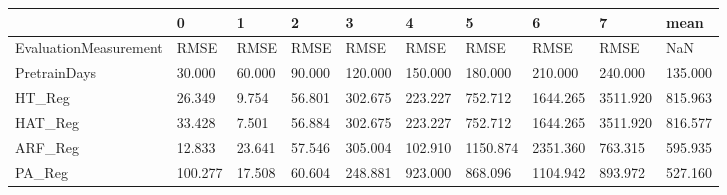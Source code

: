 \begin{tabular}{llllllllll}
\toprule
{} &       0 &      1 &      2 &       3 &       4 &        5 &        6 &        7 &    mean \\
\midrule
EvaluationMeasurement &    RMSE &   RMSE &   RMSE &    RMSE &    RMSE &     RMSE &     RMSE &     RMSE &     NaN \\
PretrainDays          &  30.000 & 60.000 & 90.000 & 120.000 & 150.000 &  180.000 &  210.000 &  240.000 & 135.000 \\
HT\_Reg                &  26.349 &  9.754 & 56.801 & 302.675 & 223.227 &  752.712 & 1644.265 & 3511.920 & 815.963 \\
HAT\_Reg               &  33.428 &  7.501 & 56.884 & 302.675 & 223.227 &  752.712 & 1644.265 & 3511.920 & 816.577 \\
ARF\_Reg               &  12.833 & 23.641 & 57.546 & 305.004 & 102.910 & 1150.874 & 2351.360 &  763.315 & 595.935 \\
PA\_Reg                & 100.277 & 17.508 & 60.604 & 248.881 & 923.000 &  868.096 & 1104.942 &  893.972 & 527.160 \\
\bottomrule
\end{tabular}
